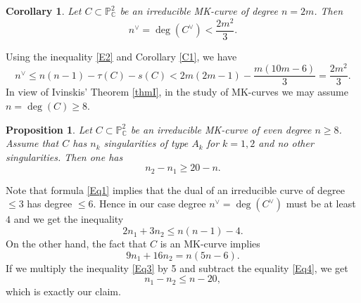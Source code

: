 \documentclass[11pt]{amsart}
\theoremstyle{plain}
\newtheorem{proposition}[thm]{Proposition}
\newtheorem{corollary}[thm]{Corollary}
\theoremstyle{definition}
\numberwithin{equation}{section}
\begin{document}
\begin{corollary}
\label{C10}
Let $C \subset \mathbb{P}^{2}_{\mathbb{C}}$ be an irreducible MK-curve of degree $n=2m$. Then
$$n^{\vee} = \deg (C^{\vee}) <\frac{2m^2}{3}. $$
\end{corollary}
\proof
Using the inequality \eqref{E2} and Corollary \ref{C1}, we have
$$n^{\vee} \leq n(n-1)-\tau(C)-s(C)<2m(2m-1)-\frac{m(10m-6)}{3}=\frac{2m^2}{3}. $$
\endproof
In view of Ivinskis' Theorem \ref{thmI}, in the study of MK-curves we may assume
$n= \deg (C) \geq 8$. 
\begin{proposition}
\label{P10}
Let $C \subset \mathbb{P}^{2}_{\mathbb{C}}$ be an irreducible MK-curve of even degree $n\geq 8$. Assume that $C$ has $n_k$ singularities of type $A_k$ for $k=1,2$ and no other singularities. Then one has
$$n_2-n_1 \geq 20-n.$$
\end{proposition}
\proof
Note that formula \eqref{Eq1} implies that the dual of an irreducible curve of degree $\leq 3$ has degree $\leq 6$.
Hence in our case degree $n^{\vee} = \deg (C^{\vee})$ must be at least $4$ and we get the inequality
\begin{equation}
\label{Eq3}
2n_1+3n_2 \leq n(n-1)-4.
\end{equation}
On the other hand, the fact that $C$ is an MK-curve implies
\begin{equation}
\label{Eq4}
9n_1+16n_2 = n(5n-6).
\end{equation}
If we multiply the inequality \eqref{Eq3} by 5 and subtract the equality 
\eqref{Eq4}, we get
$$n_1-n_2\leq n-20,$$
which is exactly our claim. 
\endproof
\end{document}
